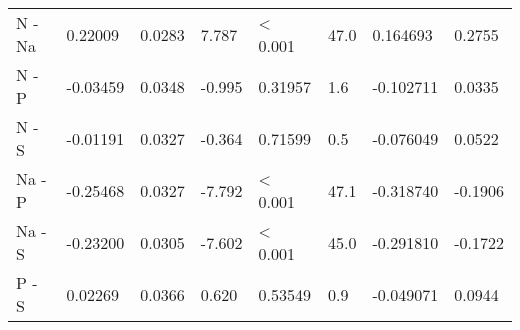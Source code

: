 \begin{tabular}[t]{llllllll}
N - Na & 0.22009 & 0.0283 & 7.787 & < 0.001 & 47.0 & 0.164693 & 0.2755\\
N - P & -0.03459 & 0.0348 & -0.995 & 0.31957 & 1.6 & -0.102711 & 0.0335\\
N - S & -0.01191 & 0.0327 & -0.364 & 0.71599 & 0.5 & -0.076049 & 0.0522\\
Na - P & -0.25468 & 0.0327 & -7.792 & < 0.001 & 47.1 & -0.318740 & -0.1906\\
Na - S & -0.23200 & 0.0305 & -7.602 & < 0.001 & 45.0 & -0.291810 & -0.1722\\
P - S & 0.02269 & 0.0366 & 0.620 & 0.53549 & 0.9 & -0.049071 & 0.0944\\
\bottomrule
\end{tabular}
